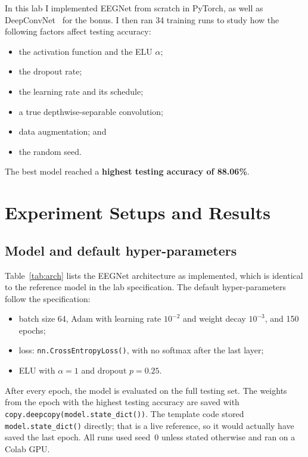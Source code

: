\documentclass[11pt,a4paper]{article}
\begin{document}
In this lab I implemented EEGNet from scratch in PyTorch, as well as DeepConvNet~\cite{deepconvnet} for the bonus. I then ran 34 training runs to study how the following factors affect testing accuracy:
\begin{itemize}
  \item the activation function and the ELU $\alpha$;
  \item the dropout rate;
  \item the learning rate and its schedule;
  \item a true depthwise-separable convolution;
  \item data augmentation; and
  \item the random seed.
\end{itemize}
The best model reached a \textbf{highest testing accuracy of 88.06\%}.

\section{Experiment Setups and Results}

\subsection{Model and default hyper-parameters}

Table~\ref{tab:arch} lists the EEGNet architecture as implemented, which is identical to the reference model in the lab specification. The default hyper-parameters follow the specification:
\begin{itemize}
  \item batch size 64, Adam with learning rate $10^{-2}$ and weight decay $10^{-3}$, and 150 epochs;
  \item loss: \texttt{nn.CrossEntropyLoss()}, with no softmax after the last layer;
  \item ELU with $\alpha=1$ and dropout $p=0.25$.
\end{itemize}
After every epoch, the model is evaluated on the full testing set. The weights from the epoch with the highest testing accuracy are saved with \texttt{copy.deepcopy(model.state\_dict())}. The template code stored \texttt{model.state\_dict()} directly; that is a live reference, so it would actually have saved the last epoch. All runs used seed~0 unless stated otherwise and ran on a Colab GPU.
\end{document}
